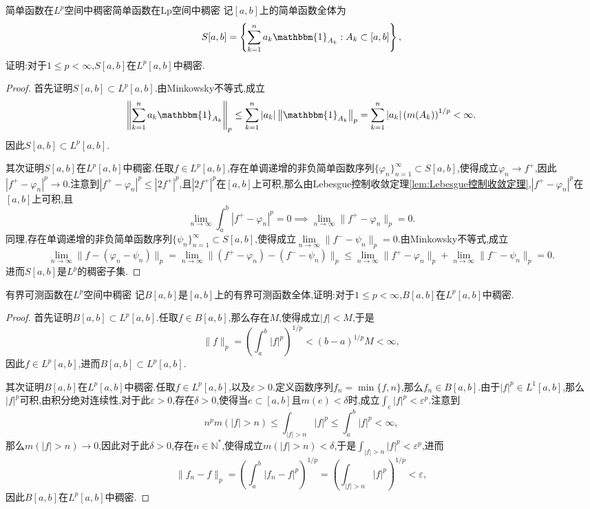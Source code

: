 \documentclass[lang = cn, scheme = chinese]{elegantbook}
\begin{document}
	\begin{lemma}{简单函数在$L^p$空间中稠密}{简单函数在Lp空间中稠密}
		记$[a,b]$上的简单函数全体为
		$$
		S[a,b]=\left\{ \sum_{k=1}^{n}a_k\mathbbm{1}_{A_k}:A_k\subset[a,b]\right\},
		$$
		证明:对于$1\le p<\infty$,$S[a,b]$在$L^p[a,b]$中稠密.
	\end{lemma}
	
	\begin{proof}
		首先证明$S[a,b]\subset L^p[a,b]$.由Minkowsky不等式,成立
		$$
		\left\| \sum_{k=1}^{n}a_k\mathbbm{1}_{A_k} \right\|_p
		\le \sum_{k=1}^{n}|a_k|\left\| \mathbbm{1}_{A_k} \right\|_p
		= \sum_{k=1}^{n}|a_k|\left(m(A_k)\right)^{1/p}
		<\infty.
		$$
		因此$S[a,b]\subset L^p[a,b]$.
		
		其次证明$S[a,b]$在$L^p[a,b]$中稠密.任取$f\in L^p[a,b]$,存在单调递增的非负简单函数序列$\{ \varphi_n \}_{n=1}^{\infty}\subset S[a,b]$,使得成立$\varphi_n\to f^+$,因此$\left|f^+-\varphi_n\right|^p\to0$.注意到$\left|f^+-\varphi_n\right|^p\le \left|2f^+\right|^p$,且$\left|2f^+\right|^p$在$[a,b]$上可积,那么由Lebesgue控制收敛定理\ref{lem:Lebesgue控制收敛定理},$\left|f^+-\varphi_n\right|^p$在$[a,b]$上可积,且
		$$
		\lim_{n\to\infty}\int_a^b \left|f^+-\varphi_n\right|^p=0
		\implies \lim_{n\to\infty}\|f^+-\varphi_n\|_p=0.
		$$
		同理,存在单调递增的非负简单函数序列$\{ \psi_n \}_{n=1}^{\infty}\subset S[a,b]$,使得成立$\lim\limits_{n\to\infty}\|f^--\psi_n\|_p=0$.由Minkowsky不等式,成立
		$$
		\lim_{n\to\infty}\| f-(\varphi_n-\psi_n) \|_p
		=\lim_{n\to\infty}\| (f^+-\varphi_n)-(f^--\psi_n) \|_p
		\le \lim_{n\to\infty}\|f^+-\varphi_n\|_p+\lim_{n\to\infty}\|f^--\psi_n\|_p=0.
		$$
		进而$S[a,b]$是$L^p$的稠密子集.
	\end{proof}
	
	\begin{lemma}{有界可测函数在$L^p$空间中稠密}
		记$B[a,b]$是$[a,b]$上的有界可测函数全体,证明:对于$1\le p<\infty$,$B[a,b]$在$L^p[a,b]$中稠密.
	\end{lemma}
	
	\begin{proof}
		首先证明$B[a,b]\subset L^p[a,b]$.任取$f\in B[a,b]$,那么存在$M$,使得成立$|f|<M$,于是
		$$
		\|f\|_p=\left(\int_a^b|f|^p\right)^{1/p}<(b-a)^{1/p}M<\infty,
		$$
		因此$f\in L^p[a,b]$,进而$B[a,b]\subset L^p[a,b]$.
		
		其次证明$B[a,b]$在$L^p[a,b]$中稠密.任取$f\in L^p[a,b]$,以及$\varepsilon>0$.定义函数序列$f_n=\min\{ f,n \}$,那么$f_n\in B[a,b]$.由于$|f|^p\in L^1[a,b]$,那么$|f|^p$可积,由积分绝对连续性,对于此$\varepsilon>0$,存在$\delta>0$,使得当$e\subset [a,b]$且$m(e)<\delta$时,成立$\displaystyle \int_{e}|f|^p <\varepsilon^p$.注意到
		$$
		n^p m(|f|>n)\le \int_{|f|>n}|f|^p\le\int_a^b|f|^p<\infty,
		$$
		那么$m(|f|>n)\to 0$,因此对于此$\delta>0$,存在$n\in\mathbb{N}^*$,使得成立$m(|f|>n)<\delta$,于是$\displaystyle \int_{|f|>n}|f|^p <\varepsilon^p$,进而
		$$
		\|f_n-f\|_p=\left(\int_a^b|f_n-f|^p\right)^{1/p}=\left(\int_{|f|>n}|f|^p\right)^{1/p}<\varepsilon,
		$$
		因此$B[a,b]$在$L^p[a,b]$中稠密.
	\end{proof}
	
\end{document}
